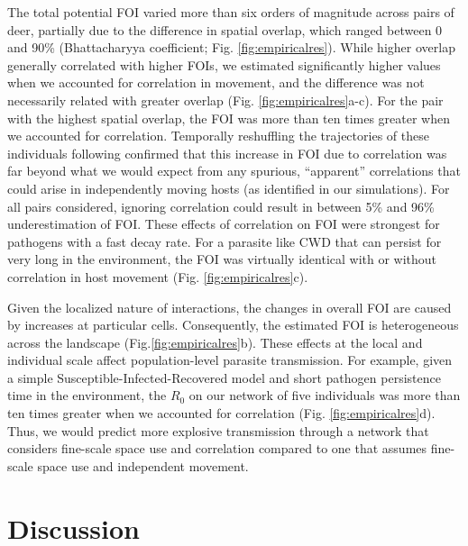 \documentclass[letterpaper]{article}
\begin{document}
The total potential FOI varied more than six orders of magnitude across pairs of deer, partially due to the difference in spatial overlap, which ranged between 0 and 90\% (Bhattacharyya coefficient; Fig. \ref{fig:empiricalres}). While higher overlap generally correlated with higher FOIs, we estimated significantly higher values when we accounted for correlation in movement, and the difference was not necessarily related with greater overlap (Fig. \ref{fig:empiricalres}a-c).  For the pair with the highest spatial overlap, the FOI was more than ten times greater when we accounted for correlation. Temporally reshuffling the trajectories of these individuals following \cite{Spiegel2016} confirmed that this increase in FOI due to correlation was far beyond what we would expect from any  spurious, ``apparent'' correlations that could arise in independently moving hosts (as identified in our simulations). For all pairs considered, ignoring correlation could result in between 5\% and 96\% underestimation of FOI. These effects of correlation on FOI were strongest for pathogens with a fast decay rate. For a parasite like CWD that can persist for very long in the environment, the FOI was virtually identical with or without correlation in host movement (Fig. \ref{fig:empiricalres}c). 

Given the localized nature of interactions, the changes in overall FOI are caused by increases at particular cells. Consequently, the estimated FOI is heterogeneous across the landscape (Fig.\ref{fig:empiricalres}b). These effects at the local and individual scale affect population-level parasite transmission. For example, given a simple Susceptible-Infected-Recovered model and short pathogen persistence time in the environment, the $R_0$ on our network of five individuals was more than ten times greater when we accounted for correlation (Fig. \ref{fig:empiricalres}d). Thus, we would predict more explosive transmission through a network that considers fine-scale space use and correlation compared to one that assumes fine-scale space use and independent movement.

\section*{Discussion}
\end{document}
